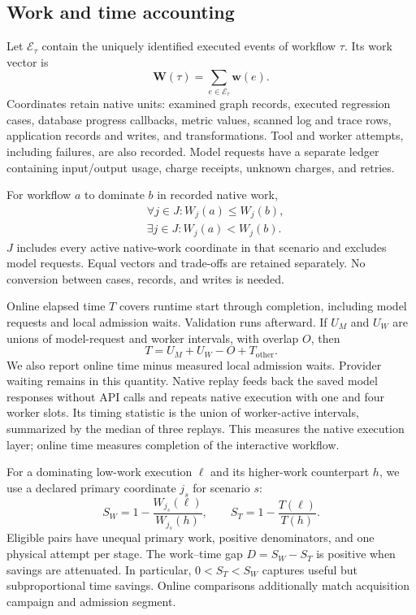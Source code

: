 \documentclass[11pt]{article}
\newcommand{\W}{\mathbf{W}}
\begin{document}
\subsection{Work and time accounting}
Let $\mathcal{E}_\tau$ contain the uniquely identified executed events of workflow $\tau$. Its work vector is
\begin{equation}
\W(\tau)=\sum_{e\in\mathcal{E}_\tau}\mathbf{w}(e).
\label{eq:work}
\end{equation}
Coordinates retain native units: examined graph records, executed regression cases, database progress callbacks, metric values, scanned log and trace rows, application records and writes, and transformations. Tool and worker attempts, including failures, are also recorded. Model requests have a separate ledger containing input/output usage, charge receipts, unknown charges, and retries.

For workflow $a$ to dominate $b$ in recorded native work,
\begin{equation}
\begin{aligned}
&\forall j\in J:W_j(a)\le W_j(b),\\
&\exists j\in J:W_j(a)<W_j(b).
\end{aligned}
\label{eq:dominance}
\end{equation}
$J$ includes every active native-work coordinate in that scenario and excludes model requests. Equal vectors and trade-offs are retained separately. No conversion between cases, records, and writes is needed.

Online elapsed time $T$ covers runtime start through completion, including model requests and local admission waits. Validation runs afterward. If $U_M$ and $U_W$ are unions of model-request and worker intervals, with overlap $O$, then
\begin{equation}
T=U_M+U_W-O+T_{\mathrm{other}}.
\end{equation}
We also report online time minus measured local admission waits. Provider waiting remains in this quantity. Native replay feeds back the saved model responses without API calls and repeats native execution with one and four worker slots. Its timing statistic is the union of worker-active intervals, summarized by the median of three replays. This measures the native execution layer; online time measures completion of the interactive workflow.

For a dominating low-work execution $\ell$ and its higher-work counterpart $h$, we use a declared primary coordinate $j_s$ for scenario $s$:
\begin{equation}
S_W=1-\frac{W_{j_s}(\ell)}{W_{j_s}(h)},\qquad
S_T=1-\frac{T(\ell)}{T(h)}.
\label{eq:savings}
\end{equation}
Eligible pairs have unequal primary work, positive denominators, and one physical attempt per stage. The work--time gap $D=S_W-S_T$ is positive when savings are attenuated. In particular, $0<S_T<S_W$ captures useful but subproportional time savings. Online comparisons additionally match acquisition campaign and admission segment.
\end{document}
